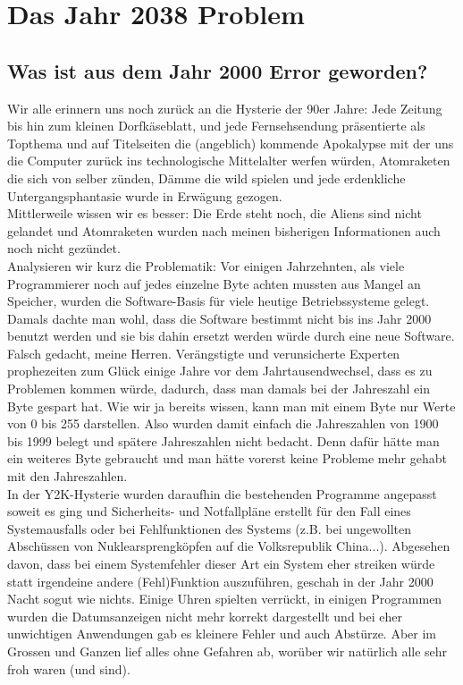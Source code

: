 \documentclass[b5paper,10pt,dvips,fleqn,titlepage,twoside]{book}
\begin{document}
\chapter{Das Jahr 2038 Problem}
\label{chapter:2038}
\section{Was ist aus dem Jahr 2000 Error geworden?}
Wir alle erinnern uns noch zurück an die Hysterie der 90er Jahre: Jede Zeitung bis hin zum kleinen Dorfkäseblatt, und jede Fernsehsendung  präsentierte als Topthema und auf Titelseiten die (angeblich) kommende Apokalypse mit der uns die Computer zurück ins technologische Mittelalter werfen würden, Atomraketen die sich von selber zünden, Dämme die wild spielen und jede erdenkliche Untergangsphantasie wurde in Erwägung gezogen.\\
Mittlerweile wissen wir es besser: Die Erde steht noch, die Aliens sind nicht gelandet und Atomraketen wurden nach meinen bisherigen Informationen auch noch nicht gezündet.\\
Analysieren wir kurz die Problematik: Vor einigen Jahrzehnten, als viele Programmierer noch auf jedes einzelne Byte achten mussten aus Mangel an Speicher, wurden die Software-Basis für viele heutige Betriebssysteme gelegt. Damals dachte man wohl, dass die Software bestimmt nicht bis ins Jahr 2000 benutzt werden und sie bis dahin ersetzt werden würde durch eine neue Software. Falsch gedacht, meine Herren. Verängstigte und verunsicherte Experten prophezeiten zum Glück einige Jahre vor dem Jahrtausendwechsel, dass es zu Problemen kommen würde, dadurch, dass man damals bei der Jahreszahl ein Byte gespart hat. Wie wir ja bereits wissen, kann man mit einem Byte nur Werte von 0 bis 255 darstellen. Also wurden damit einfach die Jahreszahlen von 1900 bis 1999 belegt und spätere Jahreszahlen nicht bedacht. Denn dafür hätte man ein weiteres Byte gebraucht und man hätte vorerst keine Probleme mehr gehabt mit den Jahreszahlen.\\
In der Y2K-Hysterie wurden daraufhin die bestehenden Programme angepasst soweit es ging und Sicherheits- und Notfallpläne erstellt für den Fall eines Systemausfalls oder bei Fehlfunktionen des Systems (z.B. bei ungewollten Abschüssen von Nuklearsprengköpfen auf die Volksrepublik China...).
Abgesehen davon, dass bei einem Systemfehler dieser Art ein System eher streiken würde statt irgendeine andere (Fehl)Funktion auszuführen, geschah in der Jahr 2000 Nacht sogut wie nichts. Einige Uhren spielten verrückt, in einigen Programmen wurden die Datumsanzeigen nicht mehr korrekt dargestellt und bei eher unwichtigen Anwendungen gab es kleinere Fehler und auch Abstürze. Aber im Grossen und Ganzen lief alles ohne Gefahren ab, worüber wir natürlich alle sehr froh waren (und sind).
\newline
\end{document}
